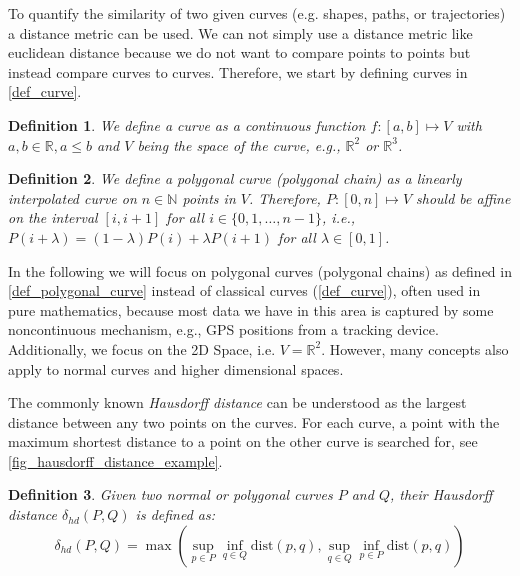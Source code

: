 \documentclass[
oneside,
fontsize=11pt
]{scrartcl}
\newtheorem{mydef}{Definition}
\begin{document}
To quantify the similarity of two given curves (e.g. shapes, paths, or trajectories)
a distance metric can be used. 
We can not simply use a distance metric like euclidean distance 
because we do not want to compare points to points 
but instead compare curves to curves. 
Therefore, we start by defining curves in \autoref{def_curve}.

\begin{mydef}
  \label{def_curve}
  We define a curve as a continuous function $f : [a,b] \mapsto V$ 
  with $a,b \in \mathbb{R}, a \leq b$ and $V$ being the space of the curve,
  e.g., $\mathbb{R}^2$ or $\mathbb{R}^3$.
\end{mydef}

\begin{mydef}
  \label{def_polygonal_curve}
  We define a polygonal curve (polygonal chain) 
  as a linearly interpolated curve 
  on $n \in \mathbb{N}$ points in $V$.
  Therefore, $P : [0,n] \mapsto V$ 
  should be affine on the interval $[i,i+1]$ for all $i \in \{0, 1, \dots, n-1\}$, 
  i.e., $P(i + \lambda) = (1 - \lambda)P(i) + \lambda P(i+1)$ for all $\lambda \in [0,1]$.
\end{mydef}

In the following we will focus on polygonal curves (polygonal chains) 
as defined in \autoref{def_polygonal_curve} 
instead of classical curves (\autoref{def_curve}), often used in pure mathematics, 
because most data we have in this area is 
captured by some noncontinuous mechanism, e.g., GPS positions from a tracking device.
Additionally, we focus on the 2D Space, i.e. $V = \mathbb{R}^2$.
However, many concepts also apply to normal curves and higher dimensional spaces.


The commonly known \textit{Hausdorff distance} can be understood 
as the largest distance between any two points on the curves. 
For each curve, a point with the maximum shortest distance to a point on the other curve is searched for, see \autoref{fig_hausdorff_distance_example}. \cite{alt_computing_1995}


\begin{mydef}
  \label{def_hausdorff_distance}
  Given two normal or polygonal curves $P$ and $Q$, 
  their Hausdorff distance $\delta_{hd}(P,Q)$ is defined as: 
  $$\delta_{hd}(P,Q) = \max \left( \sup_{p \in P} \inf_{q \in Q} \text{dist}(p,q), \sup_{q \in Q} \inf_{p \in P} \text{dist}(p,q) \right)$$
\end{mydef}
\end{document}
